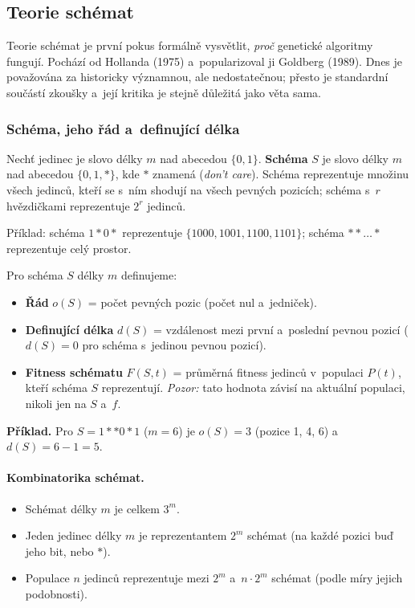 \documentclass[11pt,a4paper]{article}
\theoremstyle{definition}
\begin{document}
\subsection{Teorie schémat}
\label{ssec:teorie-schemat}

Teorie schémat je první pokus formálně vysvětlit, \emph{proč} genetické
algoritmy fungují. Pochází od Hollanda (1975) a~popularizoval ji Goldberg
(1989). Dnes je považována za historicky významnou, ale nedostatečnou; přesto
je standardní součástí zkoušky a~její kritika je stejně důležitá jako
věta sama.

\subsubsection{Schéma, jeho řád a~definující délka}

\begin{defbox}
Nechť jedinec je slovo délky $m$ nad abecedou $\{0,1\}$. \textbf{Schéma} $S$ je
slovo délky $m$ nad abecedou $\{0,1,*\}$, kde $*$ znamená  (\emph{don't care}). Schéma reprezentuje množinu všech jedinců, kteří
se s~ním shodují na všech pevných pozicích; schéma s~$r$ hvězdičkami
reprezentuje $2^r$ jedinců.
\end{defbox}

Příklad: schéma $1*0*$ reprezentuje $\{1000, 1001, 1100, 1101\}$; schéma
$**\ldots*$ reprezentuje celý prostor.

\begin{defbox}
Pro schéma $S$ délky $m$ definujeme:
\begin{itemize}
\item \textbf{Řád} $o(S)$ = počet pevných pozic (počet nul a~jedniček).
\item \textbf{Definující délka} $d(S)$ = vzdálenost mezi první a~poslední
  pevnou pozicí ($d(S) = 0$ pro schéma s~jedinou pevnou pozicí).
\item \textbf{Fitness schématu} $F(S,t)$ = průměrná fitness jedinců
  v~populaci $P(t)$, kteří schéma $S$ reprezentují. \emph{Pozor:} tato hodnota
  závisí na aktuální populaci, nikoli jen na $S$ a~$f$.
\end{itemize}
\end{defbox}

\textbf{Příklad.} Pro $S = 1{*}{*}0{*}1$ ($m=6$) je $o(S) = 3$
(pozice 1, 4, 6) a~$d(S) = 6 - 1 = 5$.

\paragraph{Kombinatorika schémat.}
\begin{itemize}
\item Schémat délky $m$ je celkem $3^m$.
\item Jeden jedinec délky $m$ je reprezentantem $2^m$ schémat (na každé pozici
  buď jeho bit, nebo $*$).
\item Populace $n$ jedinců reprezentuje mezi $2^m$ a~$n \cdot 2^m$ schémat
  (podle míry jejich podobnosti).
\end{itemize}
\end{document}
